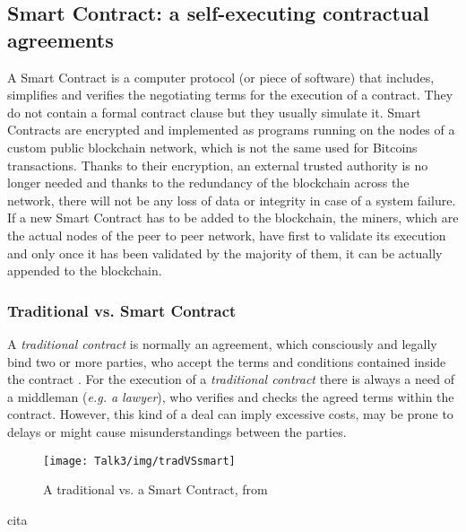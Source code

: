 \subsection{Smart Contract: a self-executing contractual agreements}
A Smart Contract is a computer protocol (or piece of software) that includes, simplifies and verifies the negotiating terms for the execution of a contract. They do not contain a formal contract clause but they usually simulate it\cite{SC1}.
Smart Contracts are encrypted and implemented as programs running on the nodes of a custom public blockchain network, which is not the same used for Bitcoins transactions. Thanks to their encryption, an external trusted authority is no longer needed and thanks to the redundancy of the blockchain across the network, there will not be any loss of data or integrity in case of a system failure.
If a new Smart Contract has to be added to the blockchain, the miners, which are the actual nodes of the peer to peer network, have first to validate its execution and only once it has been validated by the majority of them, it can be actually appended to the blockchain\cite{SC2}.


\subsubsection{Traditional vs. Smart Contract}
A \textit{traditional contract} is normally an agreement, which consciously and legally bind two or more parties, who accept the terms and conditions contained inside the contract \cite{SC12}\cite{SC13}. For the execution of a \textit{traditional contract} there is always a need of a middleman (\textit{e.g. a lawyer}), who verifies and checks the agreed terms within the contract. However, this kind of a deal can imply excessive costs, may be prone to delays or might cause misunderstandings between the parties. 

           \begin{figure}[H]
         \begin{center}
         \texttt{[image: Talk3/img/tradVSsmart]}
         \end{center}
         \caption{A traditional vs. a Smart Contract, from \cite{SC2}}
         \label{label}
       \end{figure}
cita\cite{SC2}






